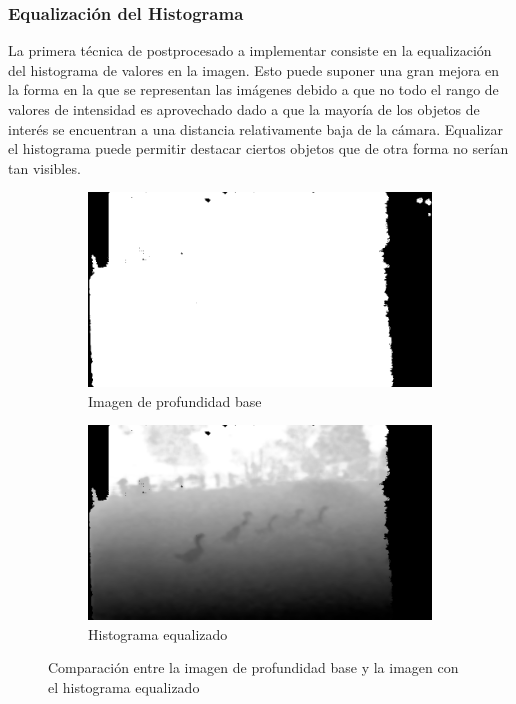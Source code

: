 \documentclass[12pt,a4paper]{report}
\begin{document}
\subsubsection{Equalización del Histograma}
La primera técnica de postprocesado a implementar consiste en la equalización del histograma de valores en la imagen. Esto puede suponer una gran mejora en la forma en la que se representan las imágenes debido a que no todo el rango de valores de intensidad es aprovechado dado a que la mayoría de los objetos de interés se encuentran a una distancia relativamente baja de la cámara. Equalizar el histograma puede permitir destacar ciertos objetos que de otra forma no serían tan visibles.
\begin{figure}[!h]
    \centering
    \begin{subfigure}{0.45\textwidth}
        \centering
        \includegraphics[width=\textwidth]{media/data/depth_gueese.png}
        \caption{Imagen de profundidad base}
    \end{subfigure}
    \hfill
    \begin{subfigure}{0.45\textwidth}
        \centering
        \includegraphics[width=\textwidth]{media/data/deptheq_gueese.png}
        \caption{Histograma equalizado}
    \end{subfigure}
    \caption{Comparación entre la imagen de profundidad base y la imagen con el histograma equalizado}
    \label{fig:depth-histeq-comparison}
\end{figure}
\end{document}
